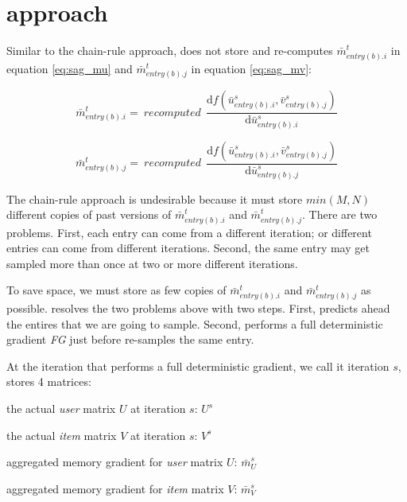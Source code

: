 \section{approach}
Similar to the chain-rule approach, \tool does not store and re-computes $\bar{m}_{entry(b).i}^{t}$ in equation \ref{eq:sag_mu} and $\bar{m}_{entry(b).j}^{t}$ in equation \ref{eq:sag_mv}:

\begin{equation} \label{eq:sagre_mi}
  \bar{m}_{entry(b).i}^{t} =\:recomputed\:\:\frac{\text{d}f(\bar{u}_{entry(b).i}^{s}, \bar{v}_{entry(b).j}^{s})}{\text{d}\bar{u}_{entry(b).i}^{s}}
\end{equation}

\begin{equation} \label{eq:sagre_mj}
  \bar{m}_{entry(b).j}^{t} =\:recomputed\:\:\frac{\text{d}f(\bar{u}_{entry(b).i}^{s}, \bar{v}_{entry(b).j}^{s})}{\text{d}\bar{u}_{entry(b).j}^{s}}
\end{equation}

The chain-rule approach is undesirable because it must store $min(M,N)$ different copies of past versions of $\bar{m}_{entry(b).i}^{t}$ and $\bar{m}_{entry(b).j}^{t}$.
There are two problems.  First, each entry can come from a different iteration; or different entries can come from different iterations.
Second, the same entry may get sampled more than once at two or more different iterations.

To save space, we must store as few copies of $\bar{m}_{entry(b).i}^{t}$ and $\bar{m}_{entry(b).j}^{t}$ as possible.
\tool resolves the two problems above with two steps.
First, \tool predicts ahead the entires that we are going to sample.
Second, \tool performs a full deterministic gradient \emph{FG} just before \tool re-samples the same entry.

At the iteration that \tool performs a full deterministic gradient, we call it iteration $s$, \tool stores 4 matrices:
\begin{sloppy}
\begin{compactenum}
\item the actual \emph{user} matrix $U$ at iteration $s$: $U^{s}$
\item the actual \emph{item} matrix $V$ at iteration $s$: $V^{s}$
\item aggregated memory gradient for \emph{user} matrix $U$: $\bar{m}_{U}^{s}$
\item aggregated memory gradient for \emph{item} matrix $V$: $\bar{m}_{V}^{s}$
\end{compactenum}
\end{sloppy}

